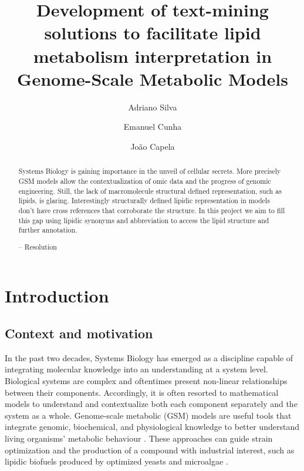 \documentclass{llncs}
\begin{document}
\pagestyle{myheadings}
\title{Development of text-mining solutions to facilitate lipid metabolism interpretation in Genome-Scale Metabolic Models}

\author{Adriano Silva\and
Emanuel Cunha \and
João Capela}

%
\maketitle              %
%
\begin{abstract}
Systems Biology is gaining importance in the unveil of cellular secrets. More precisely GSM models allow the contextualization of omic data and the progress of genomic engineering.
Still, the lack of macromolecule structural defined representation, such as lipids, is glaring.
Interestingly structurally defined lipidic representation in models don't have cross references that corroborate the structure. In this project we aim to fill this gap using lipidic synonyms and abbreviation to access the lipid structure and further annotation. 

-- Resolution

\end{abstract}
%
%
%
\section{Introduction}
\subsection{Context and motivation}
In the past two decades, Systems Biology has emerged as a discipline capable of integrating molecular knowledge into an understanding at a system level.
Biological systems are complex and oftentimes present non-linear relationships between their components. Accordingly, it is often resorted to mathematical models to understand and contextualize both each component separately and the system as a whole.
Genome-scale metabolic (GSM) models are useful tools that integrate genomic, biochemical, and physiological knowledge to better understand living organisms' metabolic behaviour \cite{Zou2018,Tavassoly2018}. 
These approaches can guide strain optimization and the production of a compound with industrial interest, such as lipidic biofuels produced by optimized yeasts and microalgae \cite{Sawangkeaw2013}.
\end{document}
